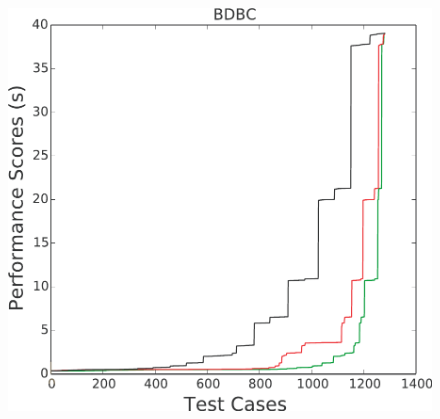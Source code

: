\documentclass[conference]{IEEEtran}
\begin{document}
\begin{figure}[htbp!]
\begin{minipage}{0.30\linewidth}
\end{minipage}
\begin{minipage}{0.30\linewidth}
\includegraphics[width=\linewidth]{figs/BDBC.pdf}
\end{minipage}\\[0.25cm]


\end{figure}
\end{document}
